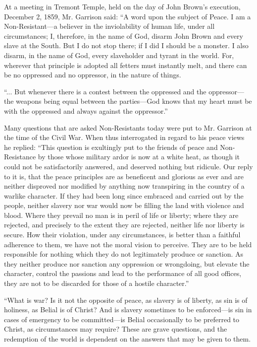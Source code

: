 \documentclass{book}
\begin{document}
At a meeting in Tremont Temple, held on the day of John Brown’s execution, December 2, 1859, Mr. Garrison said: “A word upon the subject of Peace. I am a Non-Resistant—a believer in the inviolability of human life, under all circumstances; I, therefore, in the name of God, disarm John Brown and every slave at the South. But I do not stop there; if I did I should be a monster. I also disarm, in the name of God, every slaveholder and tyrant in the world. For, wherever that principle is adopted all fetters must instantly melt, and there can be no oppressed and no oppressor, in the nature of things.

“... But whenever there is a contest between the oppressed and the oppressor— the weapons being equal between the parties—God knows that my heart must be with the oppressed and always against the oppressor.”\footnotemark[11]

Many questions that are asked Non-Resistants today were put to Mr. Garrison at the time of the Civil War. When thus interrogated in regard to his peace views he replied: “This question is exultingly put to the friends of peace and Non-Resistance by those whose military ardor is now at a white heat, as though it could not be satisfactorily answered, and deserved nothing but ridicule. Our reply to it is, that the peace principles are as beneficent and glorious as ever and are neither disproved nor modified by anything now transpiring in the country of a warlike character. If they had been long since embraced and carried out by the people, neither slavery nor war would now be filling the land with violence and blood. Where they prevail no man is in peril of life or liberty; where they are rejected, and precisely to the extent they are rejected, neither life nor liberty is secure. How their violation, under any circumstances, is better than a faithful adherence to them, we have not the moral vision to perceive. They are to be held responsible for nothing which they do not legitimately produce or sanction. As they neither produce nor sanction any oppression or wrongdoing, but elevate the character, control the passions and lead to the performance of all good offices, they are not to be discarded for those of a hostile character.”\footnotemark[12]

“What is war? Is it not the opposite of peace, as slavery is of liberty, as sin is of holiness, as Belial is of Christ? And is slavery sometimes to be enforced—is sin in cases of emergency to be committed—is Belial occasionally to be preferred to Christ, as circumstances may require? These are grave questions, and the redemption of the world is dependent on the answers that may be given to them.
\end{document}
